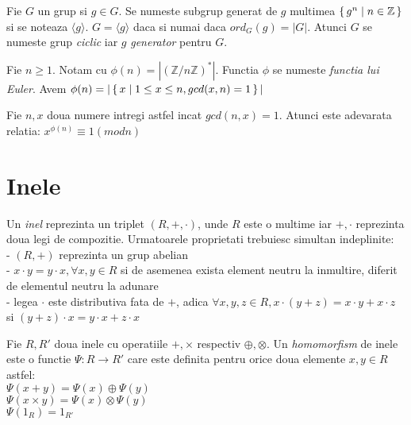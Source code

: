 \begin{dfn}
Fie $G$ un grup si $g \in G$. Se numeste subgrup generat de $g$ multimea $\set{g^n\mid n\in \mathbb{Z}}$ si se noteaza $\langle g \rangle$. $G = \langle g \rangle$ daca si numai daca $ord_G(g) = |G|$. Atunci $G$ se numeste grup \textit{ciclic} iar $g$ \textit{generator} pentru $G$.
\end{dfn}

 \begin{dfn}
 Fie $n\geq 1$. Notam cu $\phi (n) = |(\mathbb{Z}/n\mathbb{Z})^{*}|$. Functia $\phi$ se numeste \textit{functia lui Euler}. Avem $\phi (n) = |\set{x\mid 1\leq x\leq n, gcd(x, n)=1}|$
 \end{dfn}
 
 \begin{teo}
 Fie $n, x$ doua numere intregi astfel incat $gcd(n,x)=1$. Atunci este adevarata relatia:
  $x^{\phi(n)}\equiv 1 (mod n)$
 \end{teo}


\section{Inele}
\label{sec:sec02}

\begin{dfn}
Un \textit{inel} reprezinta un triplet $(R, +, \cdot)$, unde $R$ este o multime iar $+, \cdot$ reprezinta doua legi de compozitie. Urmatoarele proprietati trebuiesc simultan indeplinite: 
\\ - $(R, +)$ reprezinta un grup abelian
\\ - $x \cdot y = y \cdot x, \forall x,y\in R$ si de asemenea exista element neutru la inmultire, diferit de elementul neutru la adunare
\\ - legea $\cdot$ este distributiva fata de $+$, adica $\forall x,y,z\in R, x\cdot (y + z) = x\cdot y + x\cdot z$ si $(y + z)\cdot x = y\cdot x + z\cdot x$ 
\end{dfn}

\begin{dfn}
Fie $R, R'$ doua inele cu operatiile $+, \times$ respectiv $\oplus, \otimes$. Un \textit{homomorfism} de inele este o functie $\Psi : R\rightarrow R'$ care este definita pentru orice doua elemente $x, y\in R$ astfel:
\\$\Psi (x+y) = \Psi (x) \oplus \Psi (y)$
\\$\Psi (x\times y) = \Psi (x) \otimes \Psi (y)$
\\$\Psi (1_R) = 1_{R'}$
\end{dfn}

